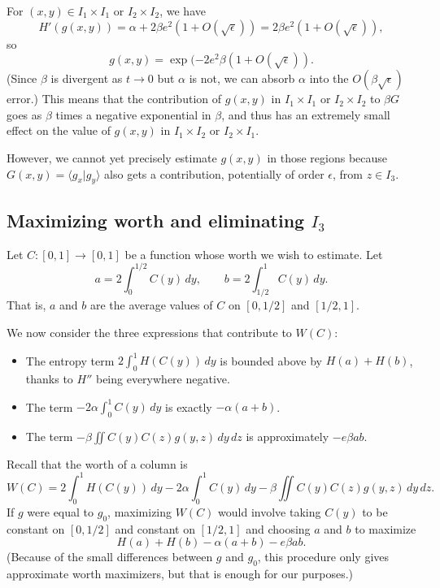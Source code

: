 \documentclass[12pt]{amsart}
\newcommand\be{\begin{equation}}
\newcommand\ee{\end{equation}}
\newcommand{\Value}{worth}
\begin{document}
{For $(x,y) \in I_1 \times I_1$ or $I_2 \times I_2$, we have 
\be H'(g(x,y)) = \alpha + 2 \beta e^2 (1 + O(\sqrt{\epsilon})) = 2 \beta e^2 (1 + O(\sqrt{\epsilon})), \ee
so 
\be g(x,y) = \exp(-2e^2 \beta(1+O(\sqrt{\epsilon})). \ee
(Since $\beta$ is divergent as $t \to 0$ but $\alpha$ is not, we can absorb $\alpha$ into the 
$O(\beta \sqrt{\epsilon})$ error.) 
This means that the contribution of $g(x,y)$ in $I_1 \times I_1$ or $I_2 \times I_2$ to $\beta G$ goes as 
$\beta$ times a negative exponential in $\beta$, and thus has an 
extremely small effect on the value of 
$g(x,y)$ in $I_1 \times I_2$ or $I_2 \times I_1$. 

However, we cannot yet precisely estimate 
$g(x,y)$ in those regions because $G(x,y) = \langle g_x | g_y \rangle$ also gets a contribution, potentially
of order $\epsilon$, from $z \in I_3$.

\subsection{Maximizing \Value{} and eliminating $I_3$}

Let $C: [0,1] \to [0,1]$ be a function whose \Value{} we wish to 
estimate. Let 
\be a = 2 \int_0^{1/2} C(y)\, dy, \qquad b = 2 \int_{1/2}^1 C(y) \, dy. \ee
That is, $a$ and $b$ are the average values of $C$ on $[0,1/2]$ and 
$[1/2,1]$. 

We now consider the three expressions that contribute to $W(C)$:
\begin{itemize}
\item The entropy term $2\int_0^1 H(C(y)) \, dy$ is bounded above by 
$H(a)+H(b)$, thanks to $H''$ being everywhere negative. 
\item The term $-2\alpha \int_0^1 C(y) \, dy$ is exactly $-\alpha (a+b)$. 
\item The term $-\beta \iint C(y) C(z) g(y,z) \, dy \, dz$
is approximately $-e\beta ab$. 
\end{itemize}

Recall that the \Value{} of a column is 
\be W(C) = 2 \int_0^1 H(C(y)) \, dy -
2 \alpha \int_0^1 C(y)\, dy - \beta \iint C(y) C(z) g(y,z) \, dy\, dz.
\label{eq:value2} \ee
If $g$ were equal to $g_0$, maximizing $W(C)$ would involve taking $C(y)$ to be constant on 
$[0,1/2]$ and constant on $[1/2,1]$ and choosing $a$ and $b$ 
to maximize 
\begin{equation} H(a) + H(b) - \alpha (a+b) - e \beta ab. 
\label{eq:ELab} \end{equation}
(Because of the small differences between $g$ and $g_0$, this procedure only gives approximate \Value{}
maximizers, but that is enough for our purposes.) 

}
\end{document}
